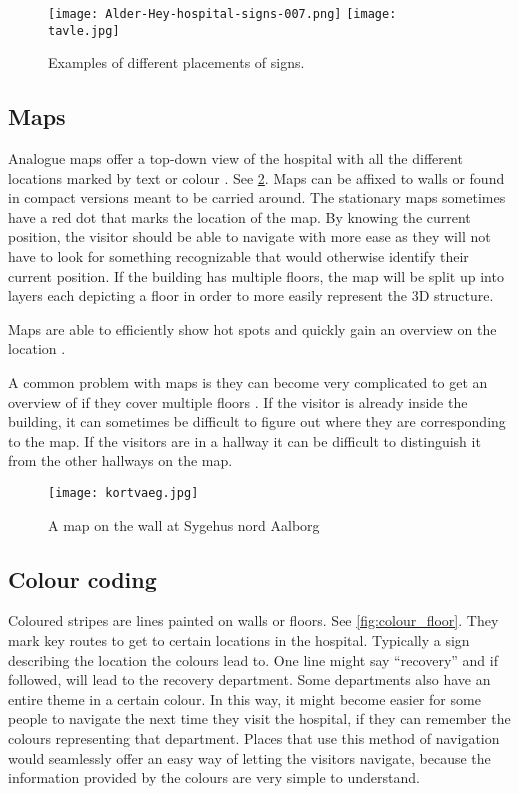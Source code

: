 \begin{figure}[htb]
  \begin{center} 
    {\texttt{[image: Alder-Hey-hospital-signs-007.png]}}
    \quad
    {\texttt{[image: tavle.jpg]}}
  \end{center}
  \caption{Examples of different placements of signs.}
  \label{fig:signs1}
\end{figure}

\subsection{Maps} \label{sub:map}
Analogue maps \cite{map} offer a top-down view of the hospital with all the different locations marked by text or colour \cite{art_Osborne}. See \cref{fig:map}. Maps can be affixed to walls or found in compact versions meant to be carried around. The stationary maps sometimes have a red dot that marks the location of the map. By knowing the current position, the visitor should be able to navigate with more ease \cite{map_survey} as they will not have to look for something recognizable that would otherwise identify their current position. If the building has multiple floors, the map will be split up into layers each depicting a floor in order to more easily represent the 3D structure.

Maps are able to efficiently show hot spots and quickly gain an overview on the location \cite{pros_analog_map}.

A common problem with maps is they can become very complicated to get an overview of if they cover multiple floors \cite{map_confusing}. If the visitor is already inside the building, it can sometimes be difficult to figure out where they are corresponding to the map. If the visitors are in a hallway it can be difficult to distinguish it from the other hallways on the map.

  \begin{figure}[h!]
  \centering
  \texttt{[image: kortvaeg.jpg]}
  \caption{A map on the wall at Sygehus nord Aalborg}
  \label{fig:map}
  \end{figure}

\subsection{Colour coding}\label{sub:col}
Coloured stripes are lines painted on walls or floors. See \cref{fig:colour_floor}. They mark key routes to get to certain locations in the hospital. Typically a sign describing the location the colours lead to. One line might say \enquote{recovery} and if followed, will lead to the recovery department. Some departments also have an entire theme in a certain colour. In this way, it might become easier for some people to navigate the next time they visit the hospital, if they can remember the colours representing that department.
Places that use this method of navigation would seamlessly offer an easy way of letting the visitors navigate, because the information provided by the colours are very simple to understand.

